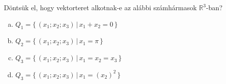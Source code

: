\begin{exercise}{%
    Döntsük el, hogy vektorteret alkotnak-e az alábbi számhármasok
    $\mathbb R^3$-ban?
  }
  \newcommand{\setmap}[2]{\Big\{\, #1 \,\Big|\, #2 \,\Big\}}
  \begin{enumerate}[a)]
    \item $Q_1 = \setmap{(x_1; x_2; x_3)}{x_1 + x_2 = 0}$
    \item $Q_2 = \setmap{(x_1; x_2; x_3)}{x_1 = \pi}$
    \item $Q_3 = \setmap{(x_1; x_2; x_3)}{x_1 = x_2 = x_3}$
    \item $Q_3 = \setmap{(x_1; x_2; x_3)}{x_1 = (x_2)^2}$
  \end{enumerate}

\end{exercise}
